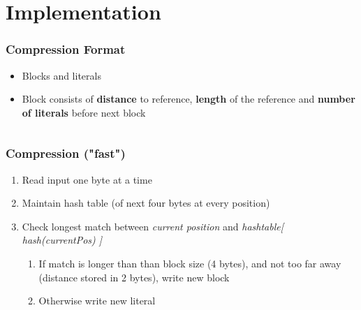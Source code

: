\documentclass{beamer}
\begin{document}

\section{Implementation} 

\begin{frame}
	\frametitle{Compression Format}
	
	\begin{itemize}
		\item Blocks and literals  
		\item Block consists of \textbf{distance} to reference, \textbf{length} of the reference and \textbf{number of literals} before next block
	\end{itemize}
	\inputminted[firstline=49, lastline=54, breaklines]{c}{wflz/wfLZ.c}	
	
\end{frame}

\begin{frame}
	\frametitle{Compression ("fast")}
	
	\begin{enumerate}
		\item Read input one byte at a time
		\item Maintain hash table (of next four bytes at every position)
		\item Check longest match between \textit{current position} and \textit{hashtable[ hash(currentPos) ]}
		\begin{enumerate}
			\item If match is longer than than block size (4 bytes), and not too far away (distance stored in 2 bytes), write new block
			\item Otherwise write new literal
		\end{enumerate}
	\end{enumerate}
\end{frame}
\end{document}
